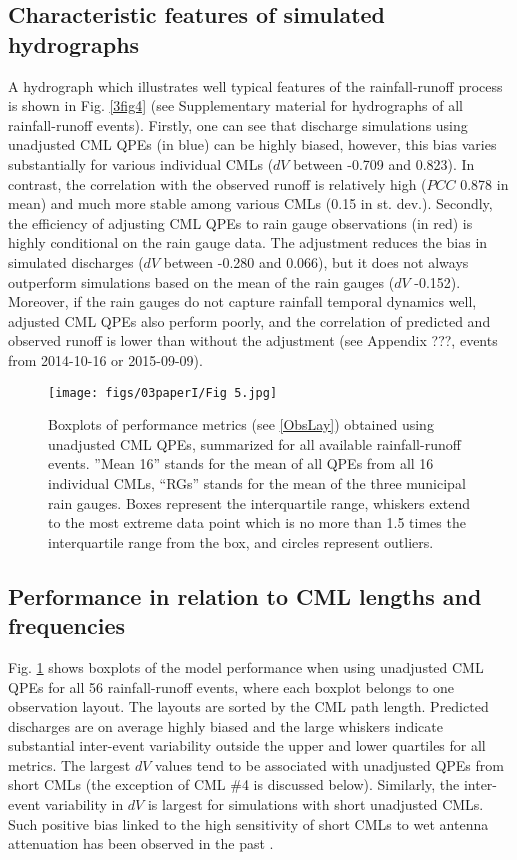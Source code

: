 \documentclass{ctuthesis}\usepackage[]{graphicx}\usepackage[]{color}
\begin{document}
\subsection{Characteristic features of simulated hydrographs}

A hydrograph which illustrates well typical features of the rainfall-runoff process is shown in Fig. \ref{3fig4} (see Supplementary material for hydrographs of all rainfall-runoff events). Firstly, one can see that discharge simulations using unadjusted CML QPEs (in blue) can be highly biased, however, this bias varies substantially for various individual CMLs ($dV$ between -0.709 and 0.823). In contrast, the correlation with the observed runoff is relatively high ($PCC$ 0.878 in mean) and much more stable among various CMLs (0.15 in st. dev.). Secondly, the efficiency of adjusting CML QPEs to rain gauge observations (in red) is highly conditional on the rain gauge data. The adjustment reduces the bias in simulated discharges ($dV$ between -0.280 and 0.066), but it does not always outperform simulations based on the mean of the rain gauges ($dV$ -0.152). Moreover, if the rain gauges do not capture rainfall temporal dynamics well, adjusted CML QPEs also perform poorly, and the correlation of predicted and observed runoff is lower than without the adjustment (see Appendix ???, events from 2014-10-16 or 2015-09-09).



\begin{figure}[h]
\begin{center}
\texttt{[image: figs/03paperI/Fig 5.jpg]}
\caption{Boxplots of performance metrics (see \ref{ObsLay}) obtained using unadjusted CML QPEs, summarized for all available rainfall-runoff events. ”Mean 16” stands for the mean of all QPEs from all 16 individual CMLs, “RGs” stands for the mean of the three municipal rain gauges. Boxes represent the interquartile range, whiskers extend to the most extreme data point which is no more than 1.5 times the interquartile range from the box, and circles represent outliers.} \label{3fig5}
\end{center}
\end{figure}


\subsection{Performance in relation to CML lengths and frequencies}

Fig. \ref{3fig5} shows boxplots of the model performance when using unadjusted CML QPEs for all 56 rainfall-runoff events, where each boxplot belongs to one observation layout. The layouts are sorted by the CML path length. Predicted discharges are on average highly biased and the large whiskers indicate substantial inter-event variability outside the upper and lower quartiles for all metrics. The largest $dV$ values tend to be associated with unadjusted QPEs from short CMLs (the exception of CML \#4 is discussed below). Similarly, the inter-event variability in $dV$ is largest for simulations with short unadjusted CMLs. Such positive bias linked to the high sensitivity of short CMLs to wet antenna attenuation has been observed in the past \citep[e.g. ][]{fenclQuantifyingWetAntenna2019}.
\end{document}
